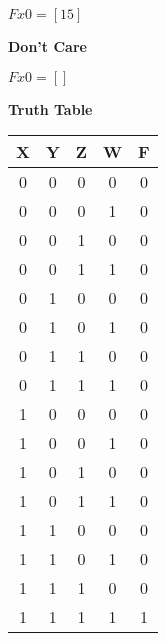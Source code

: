 $Fx0 = [15]$

\textbf{Don't Care }

$Fx0 = []$



\textbf{Truth Table }



\begin{tabular}{|c|c|c|c||c|}
\hline
X & Y & Z & W & F \\

    
        \hline
    
  
  
  0 & 0 & 0 & 0 & 0 \\

    
  
  
  0 & 0 & 0 & 1 & 0 \\

    
  
  
  0 & 0 & 1 & 0 & 0 \\

    
  
  
  0 & 0 & 1 & 1 & 0 \\

    
        \hline
    
  
  
  0 & 1 & 0 & 0 & 0 \\

    
  
  
  0 & 1 & 0 & 1 & 0 \\

    
  
  
  0 & 1 & 1 & 0 & 0 \\

    
  
  
  0 & 1 & 1 & 1 & 0 \\

    
        \hline
    
  
  
  1 & 0 & 0 & 0 & 0 \\

    
  
  
  1 & 0 & 0 & 1 & 0 \\

    
  
  
  1 & 0 & 1 & 0 & 0 \\

    
  
  
  1 & 0 & 1 & 1 & 0 \\

    
        \hline
    
  
  
  1 & 1 & 0 & 0 & 0 \\

    
  
  
  1 & 1 & 0 & 1 & 0 \\

    
  
  
  1 & 1 & 1 & 0 & 0 \\

    
  
  
  1 & 1 & 1 & 1 & 1 \\

\hline
\end{tabular}



